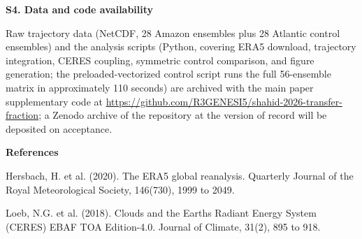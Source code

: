\textbf{S4. Data and code availability}

Raw trajectory data (NetCDF, 28 Amazon ensembles plus 28 Atlantic
control ensembles) and the analysis scripts (Python, covering ERA5
download, trajectory integration, CERES coupling, symmetric control
comparison, and figure generation; the preloaded-vectorized control
script runs the full 56-ensemble matrix in approximately 110 seconds)
are archived with the main paper supplementary code at
\url{https://github.com/R3GENESI5/shahid-2026-transfer-fraction};
a Zenodo archive of the repository at the version of record will be
deposited on acceptance.

\textbf{References}

Hersbach, H. et al. (2020). The ERA5 global reanalysis. Quarterly
Journal of the Royal Meteorological Society, 146(730), 1999 to 2049.

Loeb, N.G. et al. (2018). Clouds and the Earth\textquotesingle s Radiant
Energy System (CERES) EBAF TOA Edition-4.0. Journal of Climate, 31(2),
895 to 918.
